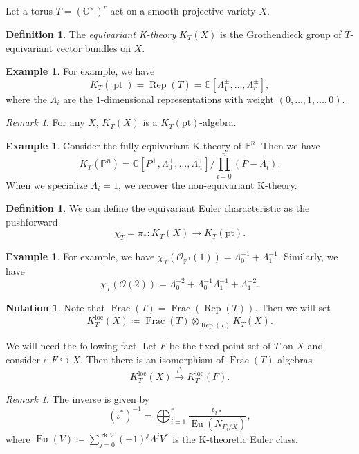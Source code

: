 \documentclass{amsart}
\theoremstyle{definition}
\newtheorem{defn}[thm]{Definition}
\newtheorem{exm}[thm]{Example}
\newtheorem{notn}[thm]{Notation}
\theoremstyle{remark}
\newtheorem{rmk}[thm]{Remark}
\theoremstyle{plain}
\theoremstyle{definition}
\theoremstyle{remark}
\newcommand{\C}{\mathbb{C}}
\renewcommand{\P}{\mathbb{P}}
\newcommand{\mc}[1]{\mathcal{#1}}
\newcommand{\mr}[1]{\mathrm{#1}}
\newcommand{\on}[1]{\operatorname{#1}}
\newcommand{\1}{\mathbf{1}}
\newcommand{\2}{\mathbf{2}}
\newcommand{\3}{\mathbf{3}}
\newcommand{\loc}{\mr{loc}}
\begin{document}
Let a torus \(T = (\C^{\times})^r\) act on a smooth projective variety \(X\).

\begin{defn}
    The \textit{equivariant K-theory} \(K_T(X)\) is the Grothendieck group of \(T\)-equivariant vector bundles on \(X\).
\end{defn}

\begin{exm}
    For example, we have
    \[ K_T(\on{pt}) = \on{Rep}(T) = \C[\Lambda_1^{\pm}, \ldots, \Lambda_r^{\pm}], \]
    where the \(\Lambda_i\) are the \(1\)-dimensional representations with weight \((0, \ldots, 1, \ldots, 0)\).
\end{exm}

\begin{rmk}
    For any \(X\), \(K_T(X)\) is a \(K_T(\mr{pt})\)-algebra.
\end{rmk}

\begin{exm}
    Consider the fully equivariant K-theory of \(\P^n\). Then we have
    \[ K_T(\P^n) = \C[P^{\pm}, \Lambda_0^{\pm}, \ldots, \Lambda_n^{\pm}] \big/ \prod_{i=0}^n (P-\Lambda_i). \]
    When we specialize \(\Lambda_i = 1\), we recover the non-equivariant K-theory.
\end{exm}

\begin{defn}
    We can define the equivariant Euler characteristic as the pushforward
    \[ \chi_T = \pi_* \colon K_T(X) \to K_T(\mr{pt}). \]
\end{defn}

\begin{exm}
    For example, we have \(\chi_T(\mc{O}_{\P^1}(1)) = \Lambda_0^{-1} + \Lambda_1^{-1}\). Similarly, we have
    \[ \chi_T(\mc{O}(2)) = \Lambda_0^{-2} + \Lambda_0^{-1} \Lambda_1^{-1} + \Lambda_1^{-2}. \]
\end{exm}

\begin{notn}
    Note that \(\on{Frac}(T) = \on{Frac}(\on{Rep}(T))\). Then we will set
    \[ K_T^{\loc}(X) \coloneqq \on{Frac}(T) \otimes_{\on{Rep}(T)} K_T(X). \]
\end{notn}

We will need the following fact. Let \(F\) be the fixed point set of \(T\) on \(X\) and consider \(\iota \colon F \hookrightarrow X\). Then there is an isomorphism of \(\on{Frac}(T)\)-algebras
\[ K_T^{\loc}(X) \xrightarrow{\iota^*} K_T^{\loc}(F). \]

\begin{rmk}
    The inverse is given by
    \[ (\iota^*)^{-1} = \bigoplus_{i=1}^r \frac{\iota_{i*}}{\on{Eu}(N_{F_i/X})}, \]
    where \(\on{Eu}(V) \coloneqq \sum_{j = 0}^{\on{rk} V} (-1)^j \Lambda^j V^*\) is the K-theoretic Euler class.
\end{rmk}
\end{document}
